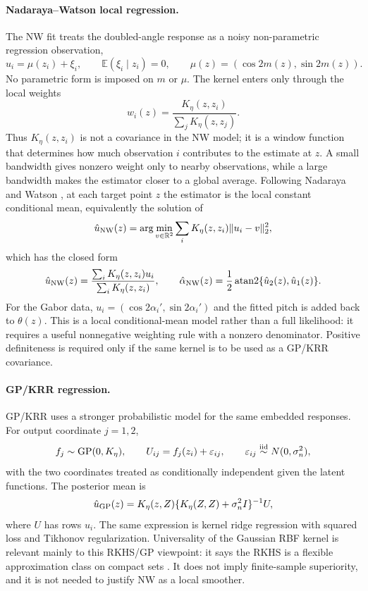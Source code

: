 \documentclass[10pt]{article}
\begin{document}
\paragraph{Nadaraya--Watson local regression.}
The NW fit treats the doubled-angle response as a noisy non-parametric regression observation,
\[
  u_i=\mu(z_i)+\xi_i,\qquad
  \mathbb E(\xi_i\mid z_i)=0,\qquad
  \mu(z)=(\cos 2m(z),\sin 2m(z)).
\]
No parametric form is imposed on $m$ or $\mu$.  The kernel enters only through the local weights
\[
  w_i(z)=\frac{K_\eta(z,z_i)}{\sum_j K_\eta(z,z_j)}.
\]
Thus $K_\eta(z,z_i)$ is not a covariance in the NW model; it is a window function that determines how much observation $i$ contributes to the estimate at $z$.  A small bandwidth gives nonzero weight only to nearby observations, while a large bandwidth makes the estimator closer to a global average.  Following Nadaraya and Watson \cite{nadaraya1964,watson1964}, at each target point $z$ the estimator is the local constant conditional mean, equivalently the solution of
\[
  \hat u_{\rm NW}(z)=
  \arg\min_{v\in\mathbb R^2}\sum_i K_\eta(z,z_i)\|u_i-v\|_2^2,
\]
which has the closed form
\begin{equation}
  \hat u_{\rm NW}(z)=
  \frac{\sum_i K_\eta(z,z_i)u_i}{\sum_i K_\eta(z,z_i)},
  \qquad
  \hat\alpha_{\rm NW}(z)=\frac12\operatorname{atan2}\{\hat u_2(z),\hat u_1(z)\}.
  \label{eq:nw}
\end{equation}
For the Gabor data, $u_i=(\cos 2\alpha_i',\sin 2\alpha_i')$ and the fitted pitch is added back to $\theta(z)$.  This is a local conditional-mean model rather than a full likelihood: it requires a useful nonnegative weighting rule with a nonzero denominator.  Positive definiteness is required only if the same kernel is to be used as a GP/KRR covariance.

\paragraph{GP/KRR regression.}
GP/KRR uses a stronger probabilistic model for the same embedded responses.  For output coordinate $j=1,2$,
\[
  f_j\sim{\rm GP}(0,K_\eta),\qquad
  U_{ij}=f_j(z_i)+\varepsilon_{ij},\qquad
  \varepsilon_{ij}\stackrel{\rm iid}{\sim}N(0,\sigma_n^2),
\]
with the two coordinates treated as conditionally independent given the latent functions.  The posterior mean is
\begin{equation}
  \hat u_{\rm GP}(z)=K_\eta(z,Z)\{K_\eta(Z,Z)+\sigma_n^2I\}^{-1}U,
  \label{eq:gpkrr}
\end{equation}
where $U$ has rows $u_i$.  The same expression is kernel ridge regression with squared loss and Tikhonov regularization.  Universality of the Gaussian RBF kernel is relevant mainly to this RKHS/GP viewpoint: it says the RKHS is a flexible approximation class on compact sets \cite{steinwart2001}.  It does not imply finite-sample superiority, and it is not needed to justify NW as a local smoother.
\end{document}
